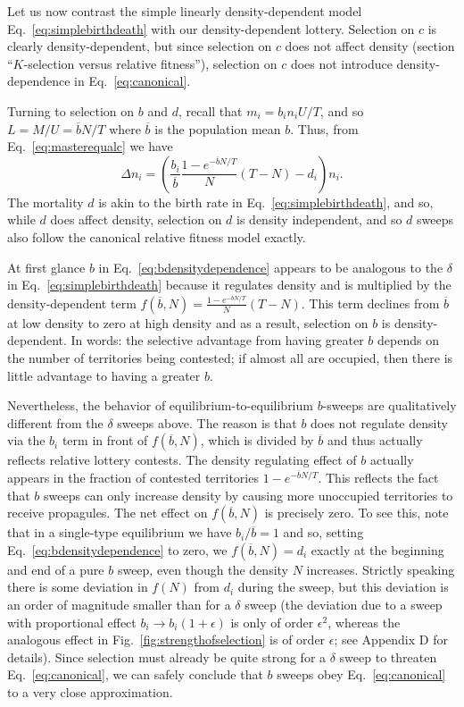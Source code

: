 \documentclass[11pt]{article}
\begin{document}
Let us now contrast the simple linearly density-dependent model Eq.~\eqref{eq:simplebirthdeath} with our density-dependent lottery. Selection on $c$ is clearly density-dependent, but since selection on $c$ does not affect density (section ``$K$-selection versus relative fitness''), selection on $c$ does not introduce density-dependence in Eq.~\eqref{eq:canonical}.  

Turning to selection on $b$ and $d$, recall that $m_i=b_i n_i U/T$, and so $L=M/U=\overline{b}N/T$ where $\overline{b}$ is the population mean $b$. Thus, from Eq.~\eqref{eq:masterequalc} we have
\begin{equation}
\Delta n_i = \left(\frac{b_i}{\overline{b}}\frac{1-e^{-\overline{b}N/T}}{N}(T-N)-d_i\right)n_i. \label{eq:bdensitydependence}
\end{equation}
The mortality $d$ is akin to the birth rate in Eq.~\eqref{eq:simplebirthdeath}, and so, while $d$ does affect density, selection on $d$ is density independent, and so $d$ sweeps also follow the canonical relative fitness model exactly.

At first glance $b$ in Eq.~\eqref{eq:bdensitydependence} appears to be analogous to the $\delta$ in Eq.~\eqref{eq:simplebirthdeath} because it regulates density and is multiplied by the density-dependent term $f(\overline{b},N)=\frac{1-e^{-\overline{b}N/T}}{N}(T-N)$. This term declines from $\overline{b}$ at low density to zero at high density and as a result, selection on $b$ is density-dependent. In words: the selective advantage from having greater $b$ depends on the number of territories being contested; if almost all are occupied, then there is little advantage to having a greater $b$.

Nevertheless, the behavior of equilibrium-to-equilibrium $b$-sweeps are qualitatively different from the $\delta$ sweeps above. The reason is that $b$ does not regulate density via the $b_i$ term in front of $f(\overline{b},N)$, which is divided by $\overline{b}$ and thus actually reflects relative lottery contests. The density regulating effect of $b$ actually appears in the fraction of contested territories $1-e^{-\overline{b}N/T}$. This reflects the fact that $b$ sweeps can only increase density by causing more unoccupied territories to receive propagules. The net effect on $f(\overline{b},N)$ is precisely zero. To see this, note that in a single-type equilibrium we have $b_i/\overline{b}=1$ and so, setting Eq.~\eqref{eq:bdensitydependence} to zero, we $f(\overline{b},N)=d_i$ exactly at the beginning and end of a pure $b$ sweep, even though the density $N$ increases. Strictly speaking there is some deviation in $f(N)$ from $d_i$ during the sweep, but this deviation is an order of magnitude smaller than for a $\delta$ sweep (the deviation due to a sweep with proportional effect $b_i\rightarrow b_i(1+\epsilon)$ is only of order $\epsilon^2$, whereas the analogous effect in Fig.~\ref{fig:strengthofselection} is of order $\epsilon$; see Appendix D for details). Since selection must already be quite strong for a $\delta$ sweep to threaten Eq.~\eqref{eq:canonical}, we can safely conclude that $b$ sweeps obey Eq.~\eqref{eq:canonical} to a very close approximation.
\end{document}
